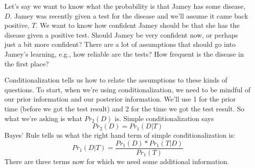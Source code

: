 \documentclass[]{tufte-book}
\begin{document}
 Let's say we want to know what the probability is that Jamey has some disease, \(D\). Jamey was recently given a test for the disease and we'll assume it came back positive, \(T\). We want to know how confident Jamey should be that she has the disease given a positive test. Should Jamey be very confident now, or perhaps just a bit more confident? There are a lot of assumptions that should go into Jamey's learning, e.g., how reliable are the tests? How frequent is the disease in the first place?

Conditionalization tells us how to relate the assumptions to these kinds of questions. To start, when we're using conditionalization, we need to be mindful of our prior information and our posterior information. We'll use 1 for the prior time (before we got the test result) and 2 for the time we got the test result. So what we're asking is what \(Pr_2(D)\) is. Simple conditionalization says
\[ Pr_2(D) = Pr_1(D|T) \]
Bayes' Rule tells us what the right hand term of simple conditionalization is:
\[Pr_1(D|T) = \frac{Pr_1(D)*Pr_1(T|D)}{Pr_1(T)}\]
There are three terms now for which we need some additional information.
\end{document}
